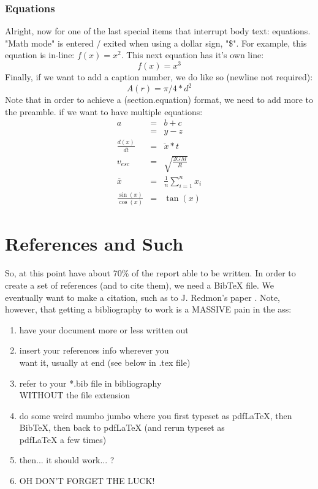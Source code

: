 \documentclass[a4paper,12pt]{article} %
\begin{document}
\subsubsection{Equations}
Alright, now for one of the last special items that interrupt body text: equations. "Math mode" is entered / exited when using a dollar sign, "\$". For example, this equation is in-line: $ f(x)=x^2 $. This next equation has it's own line: $$f(x) = x^3$$ Finally, if we want to add a caption number, we do like so (newline not required):
\begin{equation}
A(r) = \pi/4*d^2
\end{equation}
Note that in order to achieve a (section.equation) format, we need to add more to the preamble. if we want to have multiple equations:
\begin{eqnarray}
a & = & b + c \\ %
& = & y - z\\
\frac{d(x)}{dt} &=& \ddot x * t \\
v_{esc} &=& \sqrt{\frac{2GM}{R}} \\
\overline x &=& \frac{1}{n}\sum_{i=1}^{n} x_i \\ %
\frac{\sin(x)}{\cos(x)} &=& \tan(x) 
\end{eqnarray} %

\section{References and Such}
So, at this point have about 70\% of the report able to be written. In order to create a set of references (and to cite them), we need a BibTeX file. We eventually want to make a citation, such as to J. Redmon's paper \cite{red16}. Note, however, that getting a bibliography to work is a MASSIVE pain in the ass:
\begin{enumerate}
\itemsep=-0.5em %
\item have your document more or less written out
\item insert your references info wherever you \\want it, usually at end (see below in .tex file)
\item refer to your *.bib file in bibliography \\WITHOUT the file extension
\item do some weird mumbo jumbo where you first typeset as  pdfLaTeX, then BibTeX, then back to pdfLaTeX (and rerun typeset as\\  pdfLaTeX a few times)
\item then... it should work... ?
\item OH DON'T FORGET THE LUCK!
\end{enumerate}
\end{document}
